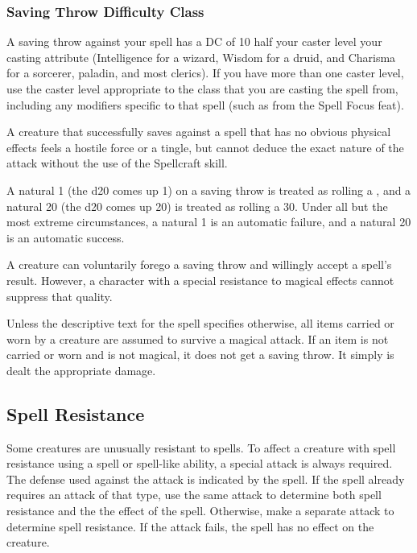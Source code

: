 \subsubsection{Saving Throw Difficulty Class}
A saving throw against your spell has a DC of 10 \add half your caster level \add your casting attribute (Intelligence for a wizard, Wisdom for a druid, and Charisma for a sorcerer, paladin, and most clerics). If you have more than one caster level, use the caster level appropriate to the class that you are casting the spell from, including any modifiers specific to that spell (such as from the Spell Focus feat).

 A creature that successfully saves against a spell that has no obvious physical effects feels a hostile force or a tingle, but cannot deduce the exact nature of the attack without the use of the Spellcraft skill.

 A natural 1 (the d20 comes up 1) on a saving throw is treated as rolling a , and a natural 20 (the d20 comes up 20) is treated as rolling a 30. Under all but the most extreme circumstances, a natural 1 is an automatic failure, and a natural 20 is an automatic success.

 A creature can voluntarily forego a saving throw and willingly accept a spell's result. However, a character with a special resistance to magical effects cannot suppress that quality.

 Unless the descriptive text for the spell specifies otherwise, all items carried or worn by a creature are assumed to survive a magical attack. If an item is not carried or worn and is not magical, it does not get a saving throw. It simply is dealt the appropriate damage.

\subsection{Spell Resistance}
Some creatures are unusually resistant to spells. To affect a creature with spell resistance using a spell or spell-like ability, a special attack is always required. The defense used against the attack is indicated by the spell. If the spell already requires an attack of that type, use the same attack to determine both spell resistance and the the effect of the spell. Otherwise, make a separate attack to determine spell resistance. If the attack fails, the spell has no effect on the creature.

